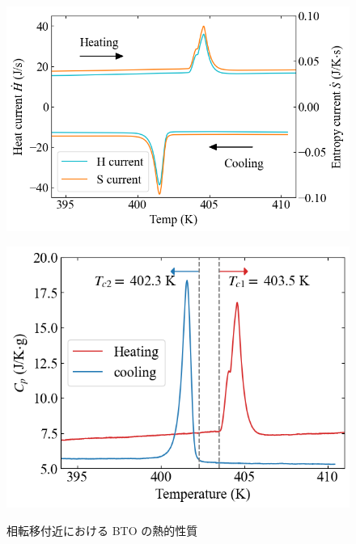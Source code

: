 \documentclass[9pt,dvipdfmx,a4paper]{jsarticle}
\begin{document}
\begin{figure}[hbt]
    \centering
    \begin{minipage}[t]{0.52\columnwidth}
        \centering
        \includegraphics[width = \columnwidth]{result/BTO-current.png}
        \label{graph:BTO-current}
    \end{minipage}
    \hfill
    \begin{minipage}[t]{0.44\columnwidth}
        \centering
        \includegraphics[width = \columnwidth]{result/BTO-Cp.png}
        \label{graph:BTO-Cp}
    \end{minipage}
    \caption{相転移付近における BTO の熱的性質}
    \label{graph:BTO}
\end{figure}
\end{document}
